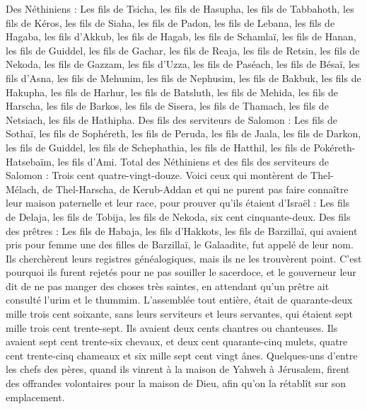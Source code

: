 \begin{multicols}{2}
Des Néthiniens : Les fils de Tsicha, les fils de Hasupha, les fils de Tabbahoth,
les fils de Kéros, les fils de Siaha, les fils de Padon,
les fils de Lebana, les fils de Hagaba, les fils d'Akkub,
les fils de Hagab, les fils de Schamlaï, les fils de Hanan,
les fils de Guiddel, les fils de Gachar, les fils de Reaja,
les fils de Retsin, les fils de Nekoda, les fils de Gazzam,
les fils d'Uzza, les fils de Paséach, les fils de Bésaï,
les fils d'Asna, les fils de Mehunim, les fils de Nephusim,
les fils de Bakbuk, les fils de Hakupha, les fils de Harhur,
les fils de Batsluth, les fils de Mehida, les fils de Harscha,
les fils de Barkos, les fils de Sisera, les fils de Thamach,
les fils de Netsiach, les fils de Hathipha.
Des fils des serviteurs de Salomon : Les fils de Sothaï, les fils de Sophéreth, les fils de Peruda,
les fils de Jaala, les fils de Darkon, les fils de Guiddel,
les fils de Schephathia, les fils de Hatthil, les fils de Pokéreth-Hatsebaïm, les fils d'Ami.
Total des Néthiniens et des fils des serviteurs de Salomon : Trois cent quatre-vingt-douze.
Voici ceux qui montèrent de Thel-Mélach, de Thel-Harscha, de Kerub-Addan et qui ne purent pas faire connaître leur maison paternelle et leur race, pour prouver qu'ils étaient d'Israël :
Les fils de Delaja, les fils de Tobija, les fils de Nekoda, six cent cinquante-deux.
Des fils des prêtres : Les fils de Habaja, les fils d'Hakkots, les fils de Barzillaï, qui avaient pris pour femme une des filles de Barzillaï, le Galaadite, fut appelé de leur nom.
Ils cherchèrent leurs registres généalogiques, mais ils ne les trouvèrent point. C'est pourquoi ils furent rejetés pour ne pas souiller le sacerdoce,
et le gouverneur leur dit de ne pas manger des choses très saintes, en attendant qu'un prêtre ait consulté l'urim et le thummim.
L'assemblée tout entière, était de quarante-deux mille trois cent soixante,
sans leurs serviteurs et leurs servantes, qui étaient sept mille trois cent trente-sept. Ils avaient deux cents chantres ou chanteuses.
Ils avaient sept cent trente-six chevaux, et deux cent quarante-cinq mulets,
quatre cent trente-cinq chameaux et six mille sept cent vingt ânes.
Quelques-uns d'entre les chefs des pères, quand ils vinrent à la maison de Yahweh à Jérusalem, firent des offrandes volontaires pour la maison de Dieu, afin qu'on la rétablît sur son emplacement.

\end{multicols}

